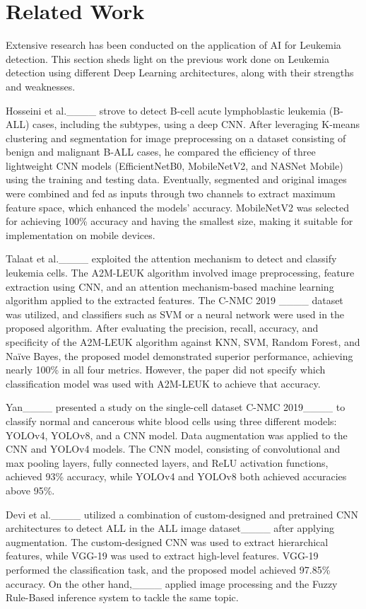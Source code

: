 \section{Related Work}
\label{sec:relatedwork}

Extensive research has been conducted on the application of AI for Leukemia detection. This section sheds light on the previous work done on Leukemia detection using different Deep Learning architectures, along with their strengths and weaknesses.

Hosseini et al.____ strove to detect B-cell acute lymphoblastic leukemia (B-ALL) cases, including the subtypes, using a deep CNN. After leveraging K-means clustering and segmentation for image preprocessing on a dataset consisting of benign and malignant B-ALL cases, he compared the efficiency of three lightweight CNN models (EfficientNetB0, MobileNetV2, and NASNet Mobile) using the training and testing data. Eventually, segmented and original images were combined and fed as inputs through two channels to extract maximum feature space, which enhanced the models' accuracy. MobileNetV2 was selected for achieving 100\% accuracy and having the smallest size, making it suitable for implementation on mobile devices.

Talaat et al.____ exploited the attention mechanism to detect and classify leukemia cells. The A2M-LEUK algorithm involved image preprocessing, feature extraction using CNN, and an attention mechanism-based machine learning algorithm applied to the extracted features. The C-NMC 2019 ____ dataset was utilized, and classifiers such as SVM or a neural network were used in the proposed algorithm. After evaluating the precision, recall, accuracy, and specificity of the A2M-LEUK algorithm against KNN, SVM, Random Forest, and Naïve Bayes, the proposed model demonstrated superior performance, achieving nearly 100\% in all four metrics. However, the paper did not specify which classification model was used with A2M-LEUK to achieve that accuracy.

Yan____ presented a study on the single-cell dataset C-NMC 2019____ to classify normal and cancerous white blood cells using three different models: YOLOv4, YOLOv8, and a CNN model. Data augmentation was applied to the CNN and YOLOv4 models. The CNN model, consisting of convolutional and max pooling layers, fully connected layers, and ReLU activation functions, achieved 93\% accuracy, while YOLOv4 and YOLOv8 both achieved accuracies above 95\%.

Devi et al.____ utilized a combination of custom-designed and pretrained CNN architectures to detect ALL in the ALL image dataset____ after applying augmentation. The custom-designed CNN was used to extract hierarchical features, while VGG-19 was used to extract high-level features. VGG-19 performed the classification task, and the proposed model achieved 97.85\% accuracy. On the other hand,____ applied image processing and the Fuzzy Rule-Based inference system to tackle the same topic.

